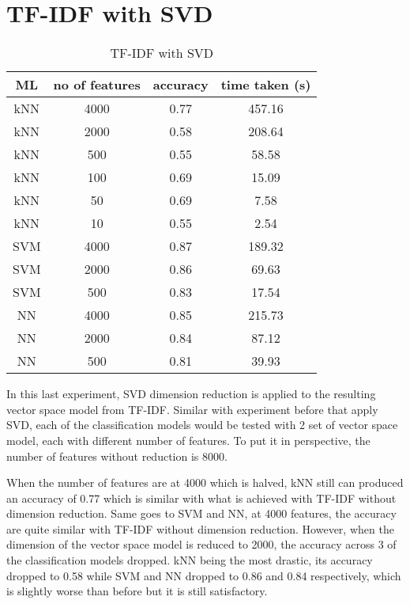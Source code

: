 \clearpage
\section{TF-IDF with SVD}

\begin{table} [ht]
	\centering
	\begin{tabular}{|| c | c | c | c||}
		\hline
		ML & no of features & accuracy & time taken (s) \\ [0.5ex]
		\hline\hline
		kNN & 4000 & 0.77 & 457.16 \\
		\hline
		kNN & 2000 & 0.58 & 208.64 \\ 
		\hline
		kNN & 500 & 0.55 & 58.58 \\ 
		\hline
		kNN & 100 & 0.69 & 15.09 \\
		\hline
		kNN & 50 & 0.69 & 7.58 \\ 
		\hline
		kNN & 10 & 0.55 & 2.54 \\ 
		\hline\hline
		SVM & 4000 & 0.87 & 189.32 \\
		\hline
		SVM & 2000 & 0.86 & 69.63 \\
		\hline
		SVM & 500 & 0.83 & 17.54 \\
		\hline\hline
		NN & 4000 & 0.85 & 215.73 \\
		\hline
		NN & 2000 & 0.84 & 87.12 \\
		\hline
		NN & 500 & 0.81 & 39.93 \\
		\hline
	\end{tabular}
\caption{TF-IDF with SVD}
\label{tbl:tfidfSvd}
\end{table}

In this last experiment, SVD dimension reduction is applied to the resulting vector space model from TF-IDF. Similar with experiment before that apply SVD, each of the classification models would be tested with 2 set of vector space model, each with different number of features. To put it in perspective, the number of features without reduction is 8000. 

When the number of features are at 4000 which is halved, kNN still can produced an accuracy of 0.77 which is similar with what is achieved with TF-IDF without dimension reduction. Same goes to SVM and NN, at 4000 features, the accuracy are quite similar with TF-IDF without dimension reduction. However, when the dimension of the vector space model is reduced to 2000, the accuracy across 3 of the classification models dropped. kNN being the most drastic, its accuracy dropped to 0.58 while SVM and NN dropped to 0.86 and 0.84 respectively, which is slightly worse than before but it is still satisfactory.

